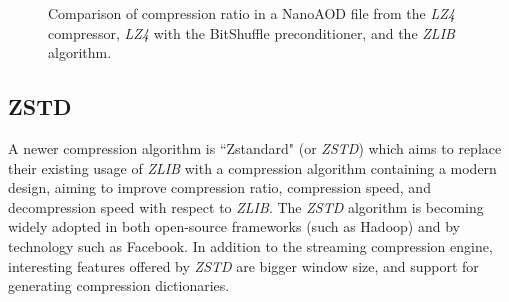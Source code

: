 \documentclass[12pt]{iopart}
\begin{document}
\begin{figure}
\centering
{}
\caption{Comparison of compression ratio in a NanoAOD file from the \textit{LZ4} compressor, \textit{LZ4} with the BitShuffle preconditioner, and the \textit{ZLIB} algorithm.} \label{fig:bitshuffle}
\end{figure}


\subsection{ZSTD}

A newer compression algorithm is ``Zstandard" (or \textit{ZSTD}) \cite{zstd} \cite{zstd-facebook} which aims to replace their existing usage of \textit{ZLIB} with a compression algorithm containing a modern design, aiming to improve compression ratio, compression speed, and decompression speed with respect to \textit{ZLIB}.  The \textit{ZSTD} algorithm is becoming widely adopted in both open-source frameworks (such as Hadoop) and by technology such as Facebook. In addition to the streaming compression engine, interesting features offered by \textit{ZSTD} are bigger window size, and support for generating compression dictionaries.
\end{document}
